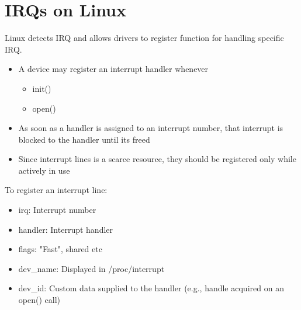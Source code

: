 \section{IRQs on Linux}

\begin{frame}{\secname}
    Linux detects IRQ and allows drivers to register function for handling specific IRQ.

    \begin{itemize}
        \item A device may register an interrupt handler whenever
        \begin{itemize}
            \item init()
            \item open()
        \end{itemize}
        \item As soon as a handler is assigned to an interrupt number, that interrupt is blocked to the handler until its freed
        \item Since interrupt lines is a scarce resource, they should be registered only while actively in use
    \end{itemize}
\end{frame}




\begin{frame}{\secname}
    To register an interrupt line:

    \regIrqList

    \begin{itemize}
        \item irq: Interrupt number
        \item handler: Interrupt handler
        \item flags: "Fast", shared etc
        \item dev\_name: Displayed in /proc/interrupt
        \item dev\_id: Custom data supplied to the handler (e.g., handle acquired on an open() call)
    \end{itemize}
\end{frame}


